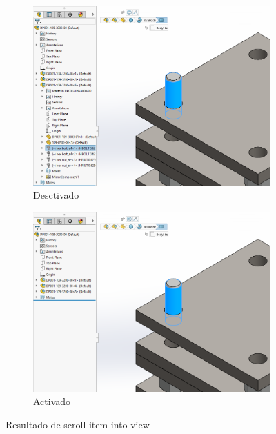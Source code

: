 \documentclass[12pt,letterpaper,final]{report}
\begin{document}
\begin{figure}[H]
	\centering
	\begin{subfigure}[b]{0.45\textwidth}
		\includegraphics[width=\textwidth]{Imagenes/solidworks_macro_09}
		\caption{Desctivado}
		\label{fig:solidworksmacro09}
	\end{subfigure}
	\begin{subfigure}[b]{0.45\textwidth}
		\includegraphics[width=\textwidth]{Imagenes/solidworks_macro_10}
		\caption{Activado}
		\label{fig:solidworksmacro10}
	\end{subfigure}
	\caption{Resultado de scroll item into view}
\end{figure}
\end{document}
